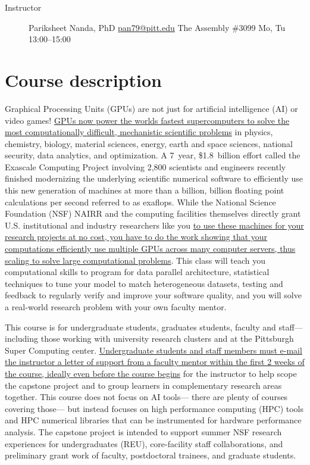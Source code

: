 \documentclass[12pt]{article}
\begin{document}

\begin{description}
\item[Instructor] Pariksheet Nanda, PhD \quad %
  \href{mailto:pan79@pitt.edu}{pan79@pitt.edu} \quad %
  The Assembly \#3099 \quad %
  Mo, Tu 13:00--15:00
\end{description}

\section{Course description}

Graphical Processing Units (GPUs) %
are not just for artificial intelligence (AI) or %
video games!
%
\ul{GPUs now power the worlds fastest supercomputers %
to solve the most computationally difficult, %
mechanistic scientific problems} in %
physics, %
chemistry, %
biology, %
material sciences, %
energy, %
earth and space sciences, %
national security, %
data analytics, and %
optimization.
%
A 7~year, \$1.8~billion effort %
called the Exascale Computing Project %
involving 2,800 scientists and engineers %
recently finished modernizing %
the underlying scientific numerical software %
to efficiently use this new generation of machines %
at more than a billion, billion floating point calculations per second %
referred to as exaflops.
%
While the National Science Foundation (NSF) NAIRR %
and the computing facilities themselves directly grant %
U.S. institutional and industry researchers like you %
\ul{to use these machines for your research projects at no cost, %
you have to do the work showing that %
your computations efficiently use %
multiple GPUs across many computer servers, %
thus scaling to solve large computational problems}.
%
This class will teach you %
computational skills to program for data parallel architecture, %
statistical techniques to tune your model to match heterogeneous datasets, %
testing and feedback %
to regularly verify and improve your software quality, %
and you will solve a real-world research problem with your own faculty mentor.

This course is for undergraduate students, %
graduates students, %
faculty and staff---%
including those working with university research clusters and %
at the Pittsburgh Super Computing center.
%
\ul{Undergraduate students and staff members %
must e-mail the instructor a letter of support from a faculty mentor %
within the first 2 weeks of the course, %
ideally even before the course begins} %
for the instructor to help scope the capstone project %
and to group learners in complementary research areas together.
%
This course does not focus on AI tools---%
there are plenty of courses covering those---%
but instead focuses on high performance computing (HPC) tools %
and HPC numerical libraries %
that can be instrumented for hardware performance analysis.
%
The capstone project is intended to support %
summer NSF research experiences for undergraduates (REU), %
core-facility staff collaborations, %
and preliminary grant work of %
faculty, postdoctoral trainees, and graduate students.
\end{document}
